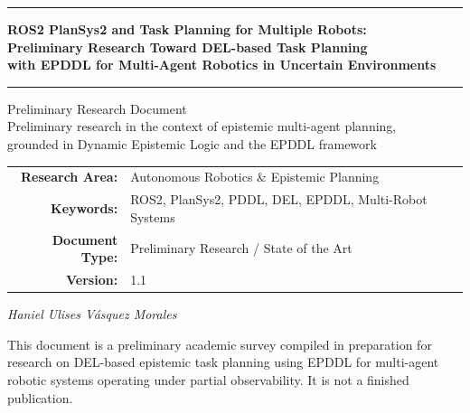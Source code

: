 \documentclass[12pt,a4paper]{article}
\theoremstyle{definition}
\theoremstyle{plain}
\begin{document}
\begin{titlepage}
\begin{center}
\vspace*{1.5cm}
{\color{darkblue}\rule{\linewidth}{1.5pt}}
\vspace{0.5cm}

{\LARGE\bfseries\color{darkblue} ROS2 PlanSys2 and Task Planning for Multiple Robots:\\[0.4em]
\large\color{darkgray} Preliminary Research Toward DEL-based Task Planning\\
with EPDDL for Multi-Agent Robotics in Uncertain Environments}

\vspace{0.5cm}
{\color{darkblue}\rule{\linewidth}{1.5pt}}
\vspace{1.5cm}

{\large Preliminary Research Document}\\[0.5em]
{\normalsize Preliminary research in the context of epistemic multi-agent planning,\\
grounded in Dynamic Epistemic Logic and the EPDDL framework}

\vspace{2cm}
\begin{tabular}{rl}
\textbf{Research Area:} & Autonomous Robotics \& Epistemic Planning \\
\textbf{Keywords:}      & ROS2, PlanSys2, PDDL, DEL, EPDDL, Multi-Robot Systems \\
\textbf{Document Type:} & Preliminary Research / State of the Art \\
\textbf{Version:}       & 1.1 \\
\end{tabular}

\vspace{3cm}
{\color{darkgray}\textit{Haniel Ulises Vásquez Morales}}

\vfill
{\small\color{darkgray} This document is a preliminary academic survey compiled in preparation for research on
DEL-based epistemic task planning using EPDDL for multi-agent robotic systems operating under
partial observability. It is not a finished publication.}
\end{center}
\end{titlepage}
\end{document}
